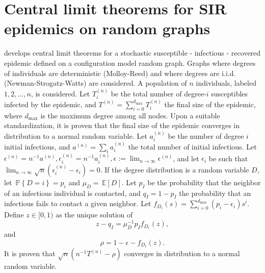 \documentclass[letterpaper, 10 pt, conference]{article}
\newcommand\pr[1]{\, \mathbb{P} \left\lbrace #1 \right\rbrace}
\newcommand\expec[1]{\, \mathbb{E} \left\lbrack #1 \right\rbrack}
\begin{document}
\section{Central limit theorems for SIR epidemics on random graphs}\label{section:epidemics}
\citet{ball2018central} develops central limit theorems for a stochastic susceptible - infectious - recovered epidemic defined on a configuration model \citep{Newman_2018} random graph. Graphs where degrees of individuals are deterministic (Molloy-Reed) and where degrees are i.i.d. (Newman-Strogatz-Watts) are considered. A population of $n$ individuals, labeled $1, 2, \dots, n$, is considered. Let $T_{i}^{(n)}$ be the total number of degree-$i$ susceptibles infected by the epidemic, and $T^{(n)} = \sum_{i = 0}^{d_\text{max}} T_{i}^{(n)}$ the final size of the epidemic, where $d_\text{max}$ is the maximum degree among all nodes. Upon a suitable standardization, it is proven that the final size of the epidemic converges in distribution to a normal random variable.  Let $a_{i}^{(n)}$ be the number of degree $i$ initial infectious, and $a^{(n)} = \sum_i a_{i}^{(n)}$ the total number of initial infectious. Let  $\epsilon^{(n)} = n^{-1} a^{(n)}, \epsilon_{i}^{(n)} = n^{-1} a_{i}^{(n)}, \epsilon := \lim_{n \rightarrow \infty} \epsilon^{(n)}$, and let $\epsilon_i$ be such that $\lim_{n \rightarrow \infty} \sqrt{n} (\epsilon_{i}^{(n)} - \epsilon_i)  =0$. If the degree distribution is a random variable $D$, let $\pr{D = i} = p_i$ and $\mu_D = \expec{D}$. Let $p_I$ be the probability that the neighbor of an infectious individual is contacted, and $q_I = 1 - p_I$ the probability that an infectious fails to contact a given neighbor. Let $f_{D_{\epsilon}} (s) = \sum_{i = 0}^{d_\text{max}} (p_i - \epsilon_{i})s^i$. Define $z \in [0,1)$ as the unique solution of 
\begin{equation}
	z - q_I = \mu_{D}^{-1} p_I f_{D_\epsilon} (z),
\end{equation}
and 
\begin{equation}
	\rho = 1 - \epsilon - f_{D_\epsilon} (z).
\end{equation}
It is proven \citep{ball2018central} that $\sqrt{n} (n^{-1} T^{(n)} - \rho)$ converges in distribution to a normal random variable.




\end{document}
